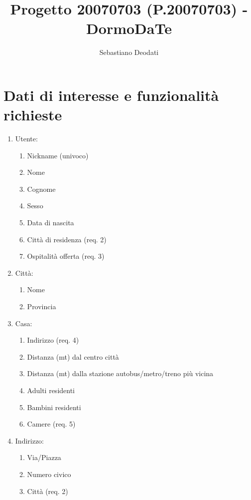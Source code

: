 \documentclass[a4paper,12pt]{report}
\title{Progetto 20070703 (P.20070703) - DormoDaTe}
\author{Sebastiano Deodati}
\begin{document}
  \maketitle
  \tableofcontents

  \chapter{Dati di interesse e funzionalità richieste}
    \begin{enumerate}[label*=\arabic*.]
      \item Utente:
        \begin{enumerate}[label*=\arabic*.]
          \item Nickname (univoco)
          \item Nome
          \item Cognome
          \item Sesso
          \item Data di nascita
          \item Città di residenza (req. 2)
          \item Ospitalità offerta (req. 3)
        \end{enumerate}
      \item Città:
        \begin{enumerate}[label*=\arabic*.]
          \item Nome
          \item Provincia
        \end{enumerate}
      \item Casa:
        \begin{enumerate}[label*=\arabic*.]
          \item Indirizzo (req. 4)
          \item Distanza (mt) dal centro città
          \item Distanza (mt) dalla stazione autobus/metro/treno più vicina
          \item Adulti residenti
          \item Bambini residenti
          \item Camere (req. 5)
        \end{enumerate}
      \item Indirizzo:
        \begin{enumerate}[label*=\arabic*.]
          \item Via/Piazza
          \item Numero civico
          \item Città (req. 2)

\end{enumerate}
\end{enumerate}
\end{document}

